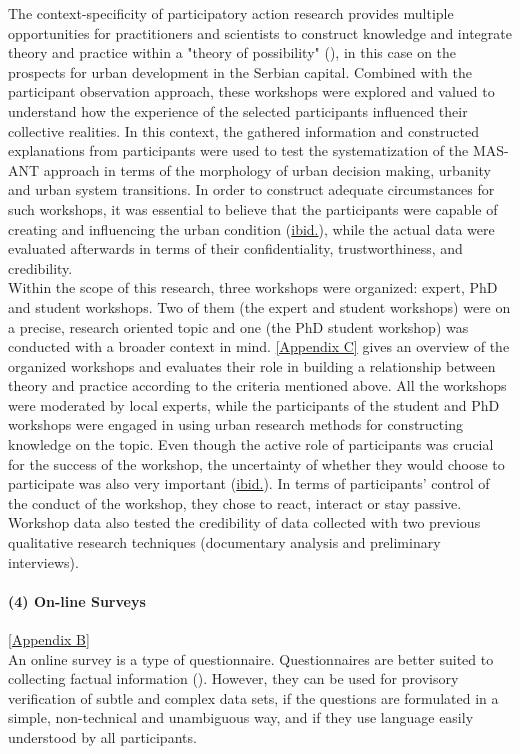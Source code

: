 \documentclass[11pt]{report}
\begin{document}
The context-specificity of participatory action research provides multiple opportunities for practitioners and scientists to construct knowledge and integrate theory  and  practice within a "theory of possibility" (\href{Mc}{\citealt{whyte_participatory_1991}}), in this case on the prospects for urban development in the Serbian capital. Combined with the participant observation approach, these workshops were explored and valued to understand how the experience of the selected participants influenced their collective realities. In this context, the gathered information and constructed explanations from participants were used to test the systematization of the MAS-ANT approach in terms of the morphology of urban decision making, urbanity and urban system transitions. In order to construct adequate circumstances for such workshops, it was essential to believe that the participants were capable of creating and influencing the urban condition (\href{Mc}{ibid.}), while the actual data were evaluated afterwards in terms of their confidentiality, trustworthiness, and credibility.
\\

Within the scope of this research, three workshops were organized: expert, PhD and student workshops. Two of them (the expert and student workshops) were on a precise, research oriented topic and one (the PhD student workshop) was conducted with a broader context in mind.
\href{Appendix C}{[Appendix C]} gives an overview of the organized workshops and evaluates their role in building a relationship between theory and practice according to the criteria mentioned above. All the workshops were moderated by local experts, while the participants of the student and PhD workshops were engaged in using urban research methods for constructing knowledge on the topic. Even though the active role of participants was crucial for the success of the workshop, the uncertainty of whether they would choose to participate was also very important (\href{Mc}{ibid.}).
In terms of participants’ control of the conduct of the workshop, they chose to react, interact or stay passive. Workshop data also tested the credibility of data collected with two previous qualitative research techniques (documentary analysis and preliminary interviews).

\paragraph{(4) On-line Surveys}
[\href{ref}{Appendix B}]
\\
An online survey is a type of questionnaire. Questionnaires are better suited to collecting factual information (\href{Payne}{\citealt{payne_key_2004}}). However, they can be used for provisory verification of subtle and complex data sets, if the questions are formulated in a simple, non-technical and unambiguous way, and if they use  language easily understood by all participants.
\\
\end{document}
